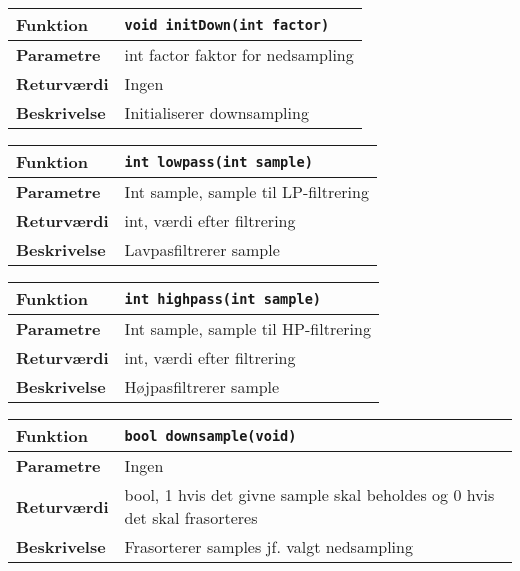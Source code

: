 \begin{center}
    \begin{tabular}{ | l | p{} |}
    \hline
    \textbf{Funktion}	& \verb+void initDown(int factor) +						\\ \hline
    \textbf{Parametre} 	& int factor faktor for nedsampling		\\ \hline
    \textbf{Returværdi}	& Ingen 								\\ \hline
    \textbf{Beskrivelse}	& Initialiserer downsampling		\\ \hline
    \end{tabular}
\end{center}

\begin{center}
    \begin{tabular}{ | l | p{} |}
    \hline
    \textbf{Funktion}	& \verb+int lowpass(int sample) +						\\ \hline
    \textbf{Parametre} 	& Int sample, sample til LP-filtrering		\\ \hline
    \textbf{Returværdi}	& int, værdi efter filtrering 								\\ \hline
    \textbf{Beskrivelse}& Lavpasfiltrerer sample		\\ \hline
    \end{tabular}
\end{center}

\begin{center}
    \begin{tabular}{ | l | p{} |}
    \hline
    \textbf{Funktion}	& \verb+int highpass(int sample) +						\\ \hline
    \textbf{Parametre} 	& Int sample, sample til HP-filtrering		\\ \hline
    \textbf{Returværdi}	& int, værdi efter filtrering 								\\ \hline
    \textbf{Beskrivelse}& Højpasfiltrerer sample		\\ \hline
    \end{tabular}
\end{center}

\begin{center}
    \begin{tabular}{ | l | p{} |}
    \hline
    \textbf{Funktion}	& \verb+bool downsample(void) +						\\ \hline
    \textbf{Parametre} 	& Ingen		\\ \hline
    \textbf{Returværdi}	&  bool, 1 hvis det givne sample skal beholdes og 0 hvis det skal frasorteres 								\\ \hline
    \textbf{Beskrivelse}& Frasorterer samples jf. valgt nedsampling		\\ \hline
    \end{tabular}
\end{center}


